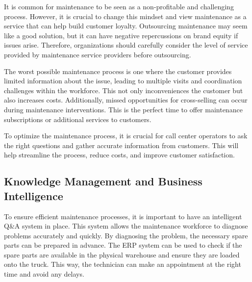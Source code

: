 
It is common for maintenance to be seen as a non-profitable and challenging process. However, it is crucial to change this mindset and view maintenance as a service that can help build customer loyalty. Outsourcing maintenance may seem like a good solution, but it can have negative repercussions on brand equity if issues arise. Therefore, organizations should carefully consider the level of service provided by maintenance service providers before outsourcing.

The worst possible maintenance process is one where the customer provides limited information about the issue, leading to multiple visits and coordination challenges within the workforce. This not only inconveniences the customer but also increases costs. Additionally, missed opportunities for cross-selling\footnotemark{} can occur during maintenance interventions. This is the perfect time to offer maintenance subscriptions or additional services to customers.

To optimize the maintenance process, it is crucial for call center operators to ask the right questions and gather accurate information from customers. This will help streamline the process, reduce costs, and improve customer satisfaction.


\subsection{Knowledge Management and Business
    Intelligence}\label{knowledge-management-and-business-intelligence}


To ensure efficient maintenance processes, it is important to have an
intelligent Q\&A system in place. This system allows the maintenance
workforce to diagnose problems accurately and quickly. By diagnosing the
problem, the necessary spare parts can be prepared in advance. The ERP
system can be used to check if the spare parts are available in the
physical warehouse and ensure they are loaded onto the truck. This way,
the technician can make an appointment at the right time and avoid any
delays.

